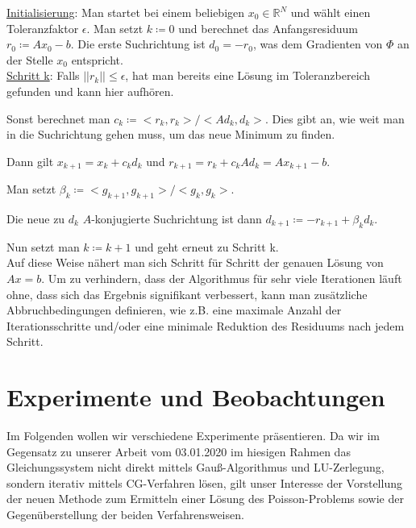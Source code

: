 \documentclass{scrartcl}
\begin{document}
\underline{Initialisierung}: Man startet bei einem beliebigen $x_0\in\mathbb{R}^N$ und wählt einen Toleranzfaktor $\epsilon$.
Man setzt $k\coloneqq 0$ und berechnet das Anfangsresiduum $r_0 \coloneqq Ax_0 - b$. Die erste Suchrichtung ist $d_0 = -r_0$, was dem Gradienten von $\Phi$ an der Stelle $x_0$ entspricht.\\

\underline{Schritt k}: Falls $||r_k||\leq \epsilon$, hat man bereits eine Lösung im Toleranzbereich gefunden und kann hier aufhören.

Sonst berechnet man $c_k \coloneqq <r_k, r_k>/<Ad_k,d_k>$. Dies gibt an, wie weit man in die Suchrichtung gehen muss, um das neue Minimum zu finden.

Dann gilt $x_{k+1} = x_k + c_k d_k$ und $r_{k+1} = r_k + c_k Ad_k = Ax_{k+1} - b$.

Man setzt $\beta_k \coloneqq <g_{k+1},g_{k+1}>/<g_{k},g_{k}>$.

Die neue zu $d_k$ $A$-konjugierte Suchrichtung ist dann $d_{k+1}\coloneqq -r_{k+1} + \beta_k d_k$.

Nun setzt man $k \coloneqq k+1$ und geht erneut zu Schritt k.\\

Auf diese Weise nähert man sich Schritt für Schritt der genauen Lösung von $Ax=b$.
Um zu verhindern, dass der Algorithmus für sehr viele Iterationen läuft ohne, dass sich das Ergebnis signifikant verbessert, kann man zusätzliche Abbruchbedingungen definieren, wie z.B. eine maximale Anzahl der Iterationsschritte und/oder eine minimale Reduktion des Residuums nach jedem Schritt. \cite{tischendorf2019}

\pagebreak
\section{Experimente und Beobachtungen}
Im Folgenden wollen wir verschiedene Experimente präsentieren.
Da wir im Gegensatz zu unserer Arbeit vom 03.01.2020 im hiesigen Rahmen das Gleichungssystem nicht direkt mittels Gauß-Algorithmus und LU-Zerlegung, sondern iterativ mittels CG-Verfahren lösen, gilt unser Interesse der Vorstellung der neuen Methode zum Ermitteln einer Lösung des Poisson-Problems sowie der Gegenüberstellung der beiden Verfahrensweisen.
\end{document}
